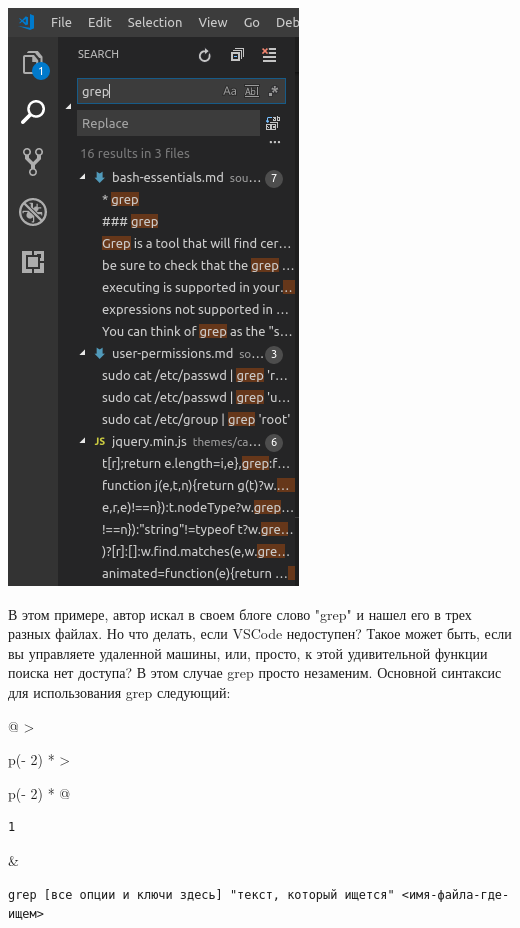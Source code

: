 \documentclass{report}
\begin{document}
\includegraphics{blog/2019/bash-essentials/vscode-search.png}

В этом примере, автор искал в своем блоге слово "grep" и нашел его в
трех разных файлах. Но что делать, если VSCode недоступен? Такое может
быть, если вы управляете удаленной машины, или, просто, к этой
удивительной функции поиска нет доступа? В этом случае grep просто
незаменим. Основной синтаксис для использования grep следующий:

\begin{longtable}[]{@{}
  >{\raggedright\arraybackslash}p{(\columnwidth - 2\tabcolsep) * }
  >{\raggedright\arraybackslash}p{(\columnwidth - 2\tabcolsep) * }@{}}
\toprule
\endhead
\begin{minipage}[t]{\linewidth}\raggedright
\begin{verbatim}
1
\end{verbatim}
\end{minipage} & \begin{minipage}[t]{\linewidth}\raggedright
\begin{verbatim}
grep [все опции и ключи здесь] "текст, который ищется" <имя-файла-где-ищем>
\end{verbatim}
\end{minipage} \\ \addlinespace
\bottomrule
\end{longtable}
\end{document}
